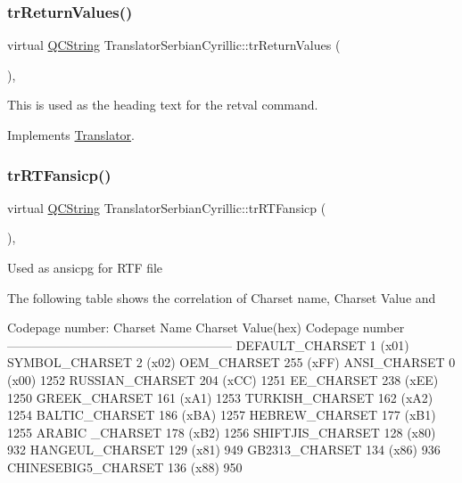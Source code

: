 \subsubsection{\texorpdfstring{trReturnValues()}{trReturnValues()}}
{\footnotesize\ttfamily virtual \mbox{\hyperlink{class_q_c_string}{Q\+C\+String}} Translator\+Serbian\+Cyrillic\+::tr\+Return\+Values (\begin{DoxyParamCaption}{ }\end{DoxyParamCaption})\hspace{0.3cm}{\ttfamily [inline]}, {\ttfamily [virtual]}}

This is used as the heading text for the retval command. 

Implements \mbox{\hyperlink{class_translator}{Translator}}.

\mbox{\label{class_translator_serbian_cyrillic_a6dcfdb3f544c2e1e32673d81c088b9e3}} 
\subsubsection{\texorpdfstring{trRTFansicp()}{trRTFansicp()}}
{\footnotesize\ttfamily virtual \mbox{\hyperlink{class_q_c_string}{Q\+C\+String}} Translator\+Serbian\+Cyrillic\+::tr\+R\+T\+Fansicp (\begin{DoxyParamCaption}{ }\end{DoxyParamCaption})\hspace{0.3cm}{\ttfamily [inline]}, {\ttfamily [virtual]}}

Used as ansicpg for R\+TF file

The following table shows the correlation of Charset name, Charset Value and 
\begin{DoxyPre}
Codepage number:
Charset Name       Charset Value(hex)  Codepage number
------------------------------------------------------
DEFAULT\_CHARSET           1 (x01)
SYMBOL\_CHARSET            2 (x02)
OEM\_CHARSET             255 (xFF)
ANSI\_CHARSET              0 (x00)            1252
RUSSIAN\_CHARSET         204 (xCC)            1251
EE\_CHARSET              238 (xEE)            1250
GREEK\_CHARSET           161 (xA1)            1253
TURKISH\_CHARSET         162 (xA2)            1254
BALTIC\_CHARSET          186 (xBA)            1257
HEBREW\_CHARSET          177 (xB1)            1255
ARABIC \_CHARSET         178 (xB2)            1256
SHIFTJIS\_CHARSET        128 (x80)             932
HANGEUL\_CHARSET         129 (x81)             949
GB2313\_CHARSET          134 (x86)             936
CHINESEBIG5\_CHARSET     136 (x88)             950
\end{DoxyPre}
 

